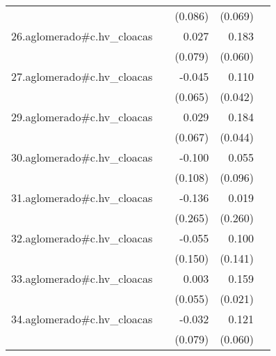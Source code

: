 {\begin{longtable}{l*{4}{D{.}{.}{-1}}}
            &                     &     (0.086)         &     (0.069)         &                     \\
\addlinespace
26.aglomerado#c.hv\_cloacas&                     &       0.027         &       0.183\sym{**} &                     \\
            &                     &     (0.079)         &     (0.060)         &                     \\
\addlinespace
27.aglomerado#c.hv\_cloacas&                     &      -0.045         &       0.110\sym{**} &                     \\
            &                     &     (0.065)         &     (0.042)         &                     \\
\addlinespace
29.aglomerado#c.hv\_cloacas&                     &       0.029         &       0.184\sym{***}&                     \\
            &                     &     (0.067)         &     (0.044)         &                     \\
\addlinespace
30.aglomerado#c.hv\_cloacas&                     &      -0.100         &       0.055         &                     \\
            &                     &     (0.108)         &     (0.096)         &                     \\
\addlinespace
31.aglomerado#c.hv\_cloacas&                     &      -0.136         &       0.019         &                     \\
            &                     &     (0.265)         &     (0.260)         &                     \\
\addlinespace
32.aglomerado#c.hv\_cloacas&                     &      -0.055         &       0.100         &                     \\
            &                     &     (0.150)         &     (0.141)         &                     \\
\addlinespace
33.aglomerado#c.hv\_cloacas&                     &       0.003         &       0.159\sym{***}&                     \\
            &                     &     (0.055)         &     (0.021)         &                     \\
\addlinespace
34.aglomerado#c.hv\_cloacas&                     &      -0.032         &       0.121\sym{*}  &                     \\
            &                     &     (0.079)         &     (0.060)         &                     \\

\end{longtable}}
